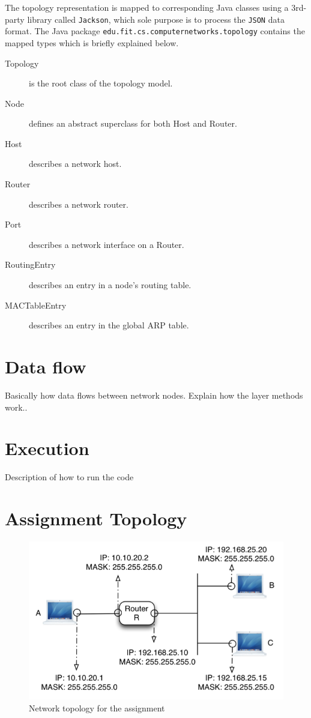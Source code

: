 \documentclass{scrartcl}
\begin{document}
The topology representation is mapped to corresponding Java classes using a 3rd-party library called \texttt{Jackson}, which sole purpose is to process the \texttt{JSON} data format. The Java package \texttt{edu.fit.cs.computernetworks.topology} contains the mapped types which is briefly explained below.

\begin{description}
\item[Topology] is the root class of the topology model.
\item[Node] defines an abstract superclass for both Host and Router.
\item[Host] describes a network host.
\item[Router] describes a network router.
\item[Port] describes a network interface on a Router.
\item[RoutingEntry] describes an entry in a node's routing table.
\item[MACTableEntry] describes an entry in the global ARP table.
\end{description}

\section{Data flow}
Basically how data flows between network nodes. Explain how the layer methods work..

\section{Execution}
Description of how to run the code

\newpage
\appendix
\section{Assignment Topology} \label{appending:topo-img}
\begin{figure}[H]
\centering
\includegraphics[scale=.65]{topology.png}
\caption{Network topology for the assignment}
\label{fig:topo}
\end{figure}
\newpage
\end{document}

